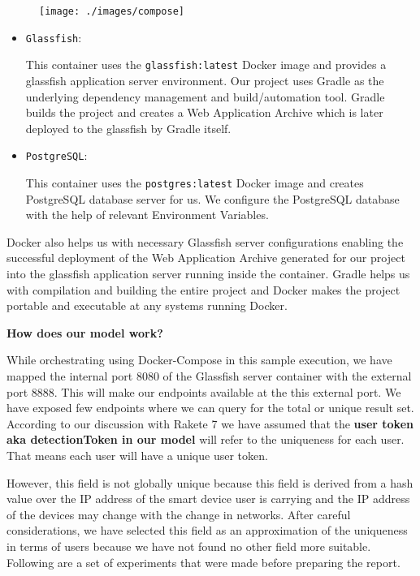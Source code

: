 \begin{figure}[H]
	\centering
	\texttt{[image: ./images/compose]}
\end{figure}

\begin{itemize}
	\item \texttt{Glassfish}: 
	\par This container uses the \texttt{glassfish:latest} Docker image and provides a glassfish application server environment. Our project uses Gradle as the underlying dependency management and build/automation tool. Gradle builds the project and creates a Web Application Archive which is later deployed to the glassfish by Gradle itself.
	
	\item \texttt{PostgreSQL}: 
	\par This container uses the \texttt{postgres:latest} Docker image and creates PostgreSQL database server for us. We configure the PostgreSQL database with the help of relevant Environment Variables. 
\end{itemize}
Docker also helps us with necessary Glassfish server configurations enabling the successful deployment of the Web Application Archive generated for our project into the glassfish application server running inside the container. Gradle helps us with compilation and building the entire project and Docker makes the project portable and executable at any systems running Docker.

\textbf{How does our model work?}

While orchestrating using Docker-Compose in this sample execution, we have mapped the internal port 8080 of the Glassfish server container with the external port 8888. This will make our endpoints available at the this external port. We have exposed few endpoints where we can query for the total or unique result set. According to our discussion with Rakete 7 we have assumed that the \textbf{user token aka detectionToken in our model} will refer to the uniqueness for each user. That means each user will have a unique user token. 

However, this field is not globally unique because this field is derived from a hash value over the IP address of the smart device user is carrying and the IP address of the devices may change with the change in networks. After careful considerations, we have selected this field as an approximation of the uniqueness in terms of users because we have not found no other field more suitable. Following are a set of experiments that were made before preparing the report.

